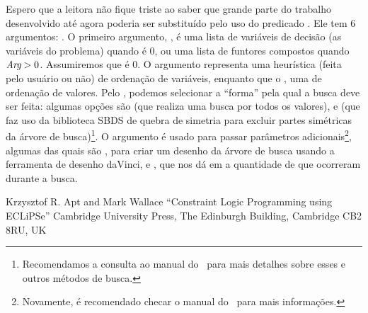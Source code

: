 Espero que a leitora não fique triste ao saber que grande parte do
trabalho desenvolvido até agora poderia ser substituído pelo uso do
predicado . Ele tem 6 argumentos:
. O primeiro argumento, , é uma lista de
variáveis de decisão (as variáveis do problema) quando  é 0,
ou uma lista de funtores compostos quando $\textit{Arg} > 0$. Assumiremos
que  é 0. O argumento  representa uma heurística
(feita pelo usuário ou não) de ordenação de variáveis, enquanto que o
, uma de ordenação de valores. Pelo , podemos
selecionar a ``forma'' pela qual a busca deve ser feita: algumas
opções são  (que realiza uma busca por todos os
valores), e  (que faz uso da biblioteca SBDS de quebra
de simetria para excluir partes simétricas da árvore de
busca)\footnote{Recomendamos a consulta ao manual do \eclipse\ para
  mais detalhes sobre esses e outros métodos de busca.}. O argumento
 é usado para passar parâmetros
adicionais\footnote{Novamente, é recomendado checar o manual do
  \eclipse\ para mais informações.}, algumas das quais são
, para criar um desenho da árvore de busca
usando a ferramenta de desenho daVinci, e ,
que nos dá em  a quantidade de  que
ocorreram durante a busca.


\begin{thebibliography}{2}

 Krzysztof R. Apt and Mark Wallace ``Constraint
  Logic Programming using ECLiPSe'' Cambridge University Press,
  The Edinburgh Building, Cambridge CB2 8RU, UK


\end{thebibliography}

%
